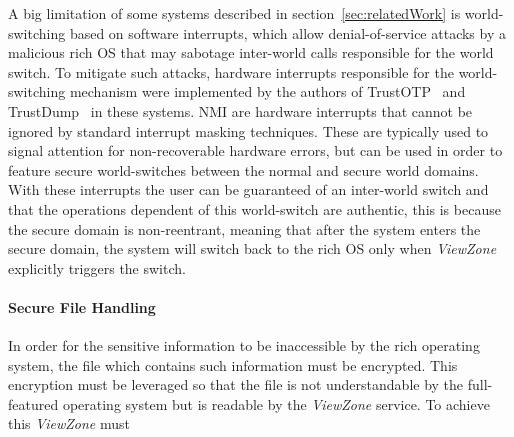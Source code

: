 A big limitation of some systems described in section~\ref{sec:relatedWork} is world-switching based on software interrupts, which allow denial-of-service attacks by a malicious rich OS that may sabotage inter-world calls responsible for the world switch. To mitigate such attacks, hardware interrupts responsible for the world-switching mechanism were implemented by the authors of TrustOTP~\cite{sun2015trustotp} and TrustDump~\cite{sun2015reliable} in these systems. \ac{NMI} are hardware interrupts that cannot be ignored by standard interrupt masking techniques. These are typically used to signal attention for non-recoverable hardware errors, but can be used in order to feature secure world-switches between the normal and secure world domains. With these interrupts the user can be guaranteed of an inter-world switch and that the operations dependent of this world-switch are authentic, this is because the secure domain is non-reentrant, meaning that after the system enters the secure domain, the system will switch back to the rich OS only when \emph{ViewZone} explicitly triggers the switch.

\paragraph{\textbf{Secure File Handling}}


In order for the sensitive information to be inaccessible by the rich operating system, the file which contains such information must be encrypted. This encryption must be leveraged so that the file is not understandable by the full-featured operating system but is readable by the \emph{ViewZone} service. To achieve this \emph{ViewZone} must  

